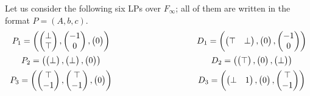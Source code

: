 \documentclass[]{article}
\renewcommand{\.}{\hskip .75pt}
\begin{document}
Let us consider the following six LPs over $F_\infty$;
all of them are written in the format $P=(A,b,c)$.
$$
\begin{array}{c@{\hspace{100pt}}c}
P_1 = \left(
	\begin{pmatrix} \bot \\ \top \end{pmatrix},
	\begin{pmatrix} -1 \\ 0 \end{pmatrix},
	\begin{pmatrix} 0 \end{pmatrix}
\right)
&
D_1 = \left(
	\begin{pmatrix} \top & \bot \end{pmatrix},
	\begin{pmatrix} 0 \end{pmatrix},
	\begin{pmatrix} -1 \\ 0 \end{pmatrix}
\right)
\vspace{5pt} \\
P_2=\left(
	\begin{pmatrix} \bot \end{pmatrix}, 
	\begin{pmatrix} \bot \end{pmatrix}, 
	\begin{pmatrix} 0 \end{pmatrix}
\right)
&
D_2=\left(
	\begin{pmatrix} \top \end{pmatrix},
	\begin{pmatrix} 0 \end{pmatrix},
	\begin{pmatrix} \bot \end{pmatrix}
\right)
\vspace{5pt} \\
P_3=\left(
	\begin{pmatrix} \top \\ -1 \end{pmatrix},
	\begin{pmatrix} \top \\ -1 \end{pmatrix},
	\begin{pmatrix} 0 \end{pmatrix}
\right)
&
D_3=\left(
	\begin{pmatrix} \bot & 1 \end{pmatrix},
	\begin{pmatrix} 0 \end{pmatrix},
	\begin{pmatrix} \top \\ -1 \end{pmatrix}
\right)
\end{array}
$$
\end{document}
